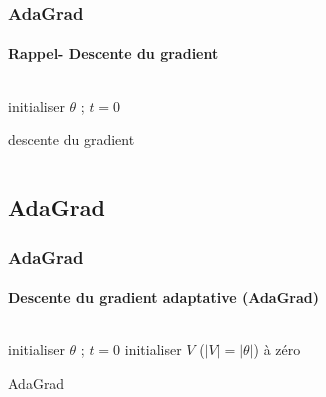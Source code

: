 \documentclass[xcolor=table]{beamer}
\begin{document}
\begin{frame}
	\frametitle{AdaGrad}
	\framesubtitle{Rappel- Descente du gradient}
	
\begin{columns}
\begin{column}{.7\textwidth}
	\begin{algorithm}[H]
		\KwResult{$ \theta $}
		initialiser $ \theta $ ; $ t = 0 $\;
		\caption{descente du gradient}
	\end{algorithm}
\end{column}
\begin{column}{.3\textwidth}
\end{column}
\end{columns}
	
\end{frame}

\subsection{AdaGrad}

\begin{frame}
	\frametitle{AdaGrad}
	\framesubtitle{Descente du gradient adaptative (AdaGrad)}
\begin{columns}
\begin{column}{.7\textwidth}
	\begin{algorithm}[H]
		\KwResult{$ \theta $}
		initialiser $ \theta $ ; $ t = 0 $\;
		initialiser $V$ ($|V| = |\theta|$) à zéro\;
		\caption{AdaGrad}
	\end{algorithm}
\end{column}
\begin{column}{.3\textwidth}
\end{column}
\end{columns}
\end{frame}


\end{document}
